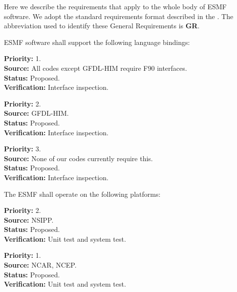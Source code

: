 
Here we describe the requirements that apply to the whole body of 
ESMF software.  We adopt the standard requirements format described in 
the .  The abbreviation used to identify
these General Requirements is {\bf GR}.


ESMF software shall support the following language bindings:

\begin{reqlist}
{\bf Priority:} 1. \\
{\bf Source:} All codes except GFDL-HIM require F90 interfaces. \\
{\bf Status:} Proposed. \\
{\bf Verification:} Interface inspection. 
\end{reqlist}

\begin{reqlist}
{\bf Priority:} 2. \\
{\bf Source:} GFDL-HIM. \\
{\bf Status:} Proposed. \\
{\bf Verification:} Interface inspection. 
\end{reqlist}

\begin{reqlist}
{\bf Priority:} 3. \\
{\bf Source:} None of our codes currently require this. \\
{\bf Status:} Proposed. \\
{\bf Verification:} Interface inspection.
\end{reqlist}

The ESMF shall operate on the following platforms:

\begin{reqlist}
{\bf Priority:} 2. \\
{\bf Source:} NSIPP. \\
{\bf Status:} Proposed. \\
{\bf Verification:} Unit test and system test.
\end{reqlist}

\begin{reqlist}
{\bf Priority:} 1. \\
{\bf Source:} NCAR, NCEP. \\
{\bf Status:} Proposed. \\
{\bf Verification:} Unit test and system test.
\end{reqlist}

